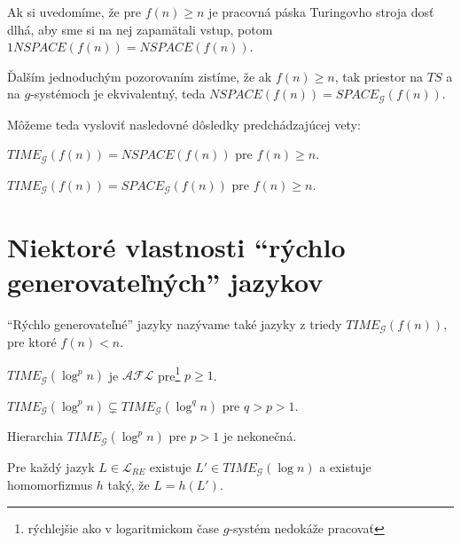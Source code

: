 Ak si uvedomíme, že pre $f(n)\geq n$ je pracovná páska Turingovho
stroja dosť dlhá, aby sme si na nej zapamätali vstup, potom
$1NSPACE(f(n))=NSPACE(f(n))$.

Ďalším jednoduchým pozorovaním zistíme, že ak $f(n)\geq n$, tak
priestor na $TS$ a na $g$-systémoch je ekvivalentný, teda
$NSPACE(f(n))=SPACE_{\mathcal{G}}(f(n))$.

Môžeme teda vysloviť nasledovné dôsledky predchádzajúcej vety:

\begin{dosledok}
  $TIME_{\mathcal{G}}(f(n))=NSPACE(f(n))$ pre $f(n)\geq n$.
\end{dosledok}

\begin{dosledok}
  $TIME_{\mathcal{G}}(f(n))=SPACE_{\mathcal{G}}(f(n))$ pre $f(n)\geq
  n$.
\end{dosledok}

\pagebreak

\section{Niektoré vlastnosti ``rýchlo generovateľných'' jazykov}

``Rýchlo generovateľné'' jazyky nazývame také jazyky z triedy
$TIME_{\mathcal{G}}(f(n))$, pre ktoré $f(n)<n$.

\begin{veta}
  $TIME_{\mathcal{G}}(\log^p n)$ je $\mathcal{AFL}$
  pre\footnote{rýchlejšie ako v logaritmickom čase $g$-systém
  nedokáže pracovať} $p\geq 1$.
\end{veta}

\begin{veta}
  $TIME_{\mathcal{G}}(\log^p n)\subsetneq TIME_{\mathcal{G}}(\log^q
  n)$ pre $q>p>1$.
\end{veta}

\begin{dosledok}
  Hierarchia $TIME_{\mathcal{G}}(\log^p n)$ pre $p>1$ je nekonečná.
\end{dosledok}

\begin{veta}
  Pre každý jazyk $L\in\mathcal{L}_{RE}$ existuje $L'\in
  TIME_{\mathcal{G}}(\log n)$ a existuje homomorfizmus $h$ taký, že
  $L=h(L')$.
\end{veta}

